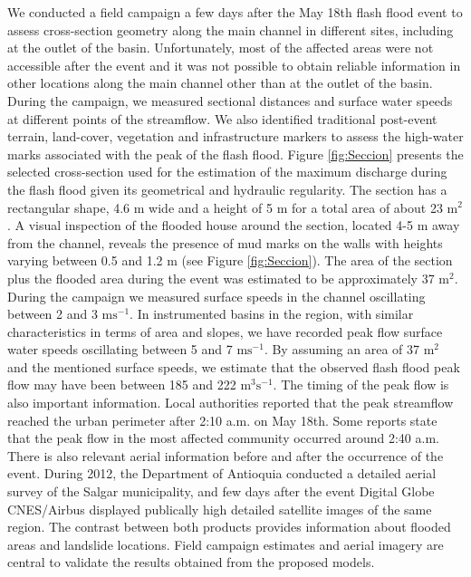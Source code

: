 \documentclass[hess, manuscript]{copernicus}
\begin{document}
We conducted a field campaign a few days after the May 18th flash flood event to assess cross-section geometry along the main channel in different sites, including at the outlet of the basin. Unfortunately, most of the affected areas were not accessible after the event and it was not  possible to obtain reliable information in other locations along the main channel other than at the outlet of the basin. During the campaign, we measured sectional distances and surface water speeds at different points of the streamflow. We also identified traditional post-event terrain, land-cover, vegetation and infrastructure markers to assess the high-water marks associated with the peak of the flash flood.  Figure \ref{fig:Seccion} presents the selected cross-section used for the estimation of the maximum discharge during the flash flood given its geometrical and hydraulic regularity. The section has a rectangular shape,  4.6 $\text{m}$ wide and a height of 5 $\text{m}$ for a total area of about 23 $\text{m}^2$. A visual inspection of the flooded house around the section,   located 4-5 $\text{m}$ away from the channel, reveals the presence of mud marks on the walls with heights varying between 0.5 and 1.2 $\text{m}$ (see Figure \ref{fig:Seccion}). The area of the section plus the flooded area during the event was estimated to be approximately 37 $\text{m}^2$.  During the campaign we measured surface speeds in the channel oscillating between 2 and 3 $\text{ms}^{-1}$.   In instrumented basins in the region, with similar characteristics in terms of area and slopes,  we have recorded peak flow surface water speeds oscillating between 5 and 7 $\text{ms}^{-1}$.  By assuming an area of 37 $\text{m}^2$ and the mentioned surface speeds,  we estimate that the observed flash flood peak flow may have been between 185 and 222 $\text{m}^3\text{s}^{-1}$. The timing of the peak flow is also important information. Local authorities reported that the peak streamflow reached the urban perimeter after 2:10 a.m. on May 18th. Some reports state that the peak flow in the most affected community occurred around 2:40 a.m.\\

There is also relevant aerial information before and after the occurrence of the event.  During 2012, the Department of Antioquia conducted a detailed aerial survey of the Salgar municipality, and few days after the event Digital Globe CNES/Airbus displayed publically high detailed satellite images of the same region.  The contrast between both products provides information about flooded areas and landslide locations.   Field campaign estimates and aerial imagery are central to validate the results obtained from the proposed models.\\
\end{document}
